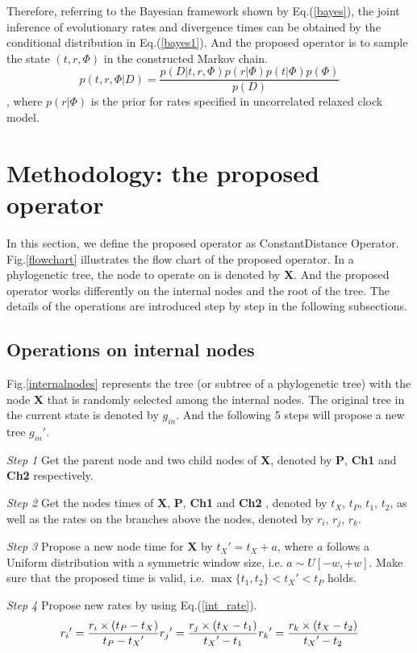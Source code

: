 \documentclass{bmcart}
\begin{document}
Therefore, referring to the Bayesian framework shown by Eq.(\ref{bayes}), the joint inference of evolutionary rates and divergence times can be obtained by the conditional distribution in Eq.(\ref{bayes1}). And the proposed operator is to sample the state $(t,r,\Phi)$ in the constructed Markov chain.
\begin{equation}\label{bayes1}
p(t,r,\Phi |D) = \frac{{p(D|t,r,\Phi )p(r|\Phi )p(t|\Phi )p(\Phi )}}{{p(D)}}
\end{equation}
, where $p(r|\Phi )$ is the prior for rates specified in uncorrelated relaxed clock model.
\section*{Methodology: the proposed operator}
In this section, we define the proposed operator as ConstantDistance Operator. Fig.\ref{flowchart} illustrates the flow chart of the proposed operator. In a phylogenetic tree, the node to operate on is denoted by \textbf{X}. And the proposed operator works differently on the internal nodes and the root of the tree. The details of the operations are introduced step by step in the following subsections.
\subsection*{Operations on internal nodes}
Fig.\ref{internalnodes} represents the tree (or subtree of a phylogenetic tree) with the node \textbf{X} that is randomly selected among the internal nodes. The original tree in the current state is denoted by $g_{in}$. And the following 5 steps will propose a new tree ${g_{in}}'$.

\emph{Step 1} Get the parent node and two child nodes of \textbf{X}, denoted by \textbf{P}, \textbf{Ch1} and \textbf{Ch2} respectively.

\emph{Step 2} Get the nodes times of \textbf{X}, \textbf{P}, \textbf{Ch1} and \textbf{Ch2} , denoted by $t_X$, $t_P$, $t_1$, $t_2$, as well as the rates on the branches above the nodes, denoted by $r_i$, $r_j$, $r_k$.

\emph{Step 3} Propose a new node time for \textbf{X} by ${t_X}' = {t_X} + a$, where $a$ follows a Uniform distribution with a symmetric window size, i.e. $a \sim U[ - w, + w]$. Make sure that the proposed time is valid, i.e. $\max \{ {t_1},{t_2}\}  < {t_X}' < {t_P}$ holds.

\emph{Step 4} Propose new rates by using Eq.(\ref{int_rate}).
\begin{equation}
 \label{int_rate}
{r_i}' = \frac{{r_i} \times ({{t_P} - {t_X}})}{{{t_P} - {t_X}'}}\\
{r_j}' = \frac{{{r_j} \times ({{t_X} - {t_1}})}}{{{t_X}' - {t_1}}}\\
{r_k}' = \frac{{{r_k} \times ({{t_X} - {t_2}})}}{{{t_X}' - {t_2}}}
 \end{equation}
\end{document}
